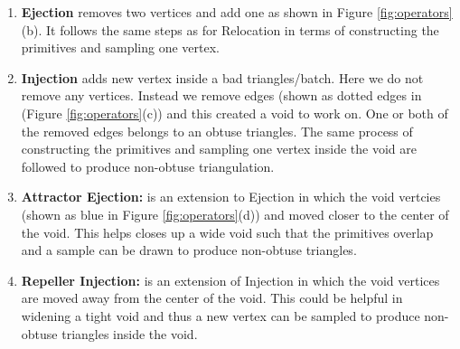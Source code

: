 \documentclass[a4paper,10pt]{article}
\begin{document}
\begin{enumerate}
\item \textbf{Ejection} removes two vertices and add one as shown in Figure \ref{fig:operators}(b). It follows the same steps as for Relocation in terms of constructing the primitives and sampling one vertex. 
\item \textbf{Injection} adds new vertex inside a bad triangles/batch. Here we do not remove any vertices. Instead we remove edges (shown as dotted edges in (Figure \ref{fig:operators}(c)) and this created a void to work on. One or both of the removed edges belongs to an obtuse triangles. The same process of constructing the primitives and sampling one vertex inside the void are followed to produce non-obtuse triangulation. 
\item \textbf{Attractor Ejection:} is an extension to Ejection in which the void vertcies (shown as blue in Figure \ref{fig:operators}(d)) and moved closer to the center of the void. This helps closes up a wide void such that the primitives overlap and a sample can be drawn to produce non-obtuse triangles. 
\item \textbf{Repeller Injection:} is an extension of Injection in which the void vertices are moved away from the center of the void. This could be helpful in widening a tight void and thus a new vertex can be sampled to produce non-obtuse triangles inside the void. 
\end{enumerate}
\end{document}
